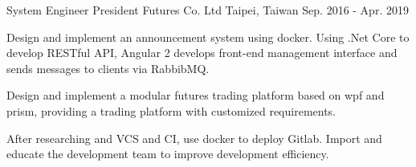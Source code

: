 \begin{cventries}
\cventry
{System Engineer} %
{President Futures Co. Ltd} %
{Taipei, Taiwan} %
{Sep. 2016 - Apr. 2019} %
{
  \begin{cvitems} %
    \item {Design and implement an announcement system using docker. Using .Net Core to develop RESTful API, Angular 2 develops front-end management interface and sends messages to clients via RabbibMQ.}
    \item {Design and implement a modular futures trading platform based on wpf and prism, providing a trading platform with customized requirements.}
    \item {After researching and VCS and CI, use docker to deploy Gitlab. Import and educate the development team to improve development efficiency.}
  \end{cvitems}
}

\end{cventries}
